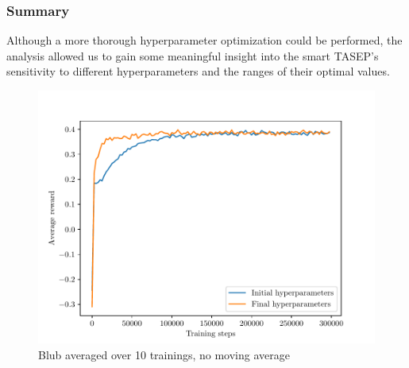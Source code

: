 \subsubsection{Summary}
Although a more thorough hyperparameter optimization could be performed, the analysis allowed us to gain some meaningful insight into the smart TASEP's sensitivity to different hyperparameters and the ranges of their optimal values. 
\begin{figure}
    \centering
    \includegraphics[width=\textwidth]{hyperparam_optim_initial_vs_final.pdf}
    \caption{Blub averaged over 10 trainings, no moving average}
    \label{fig:hyperparam_optim_8}
\end{figure}